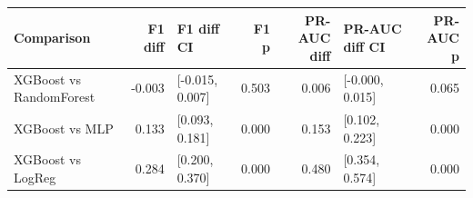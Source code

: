 \begin{tabular}{lrlrrlr}
\toprule
Comparison & F1 diff & F1 diff CI & F1 p & PR-AUC diff & PR-AUC diff CI & PR-AUC p \\
\midrule
XGBoost vs RandomForest & -0.003 & [-0.015, 0.007] & 0.503 & 0.006 & [-0.000, 0.015] & 0.065 \\
XGBoost vs MLP & 0.133 & [0.093, 0.181] & 0.000 & 0.153 & [0.102, 0.223] & 0.000 \\
XGBoost vs LogReg & 0.284 & [0.200, 0.370] & 0.000 & 0.480 & [0.354, 0.574] & 0.000 \\
\bottomrule
\end{tabular}
